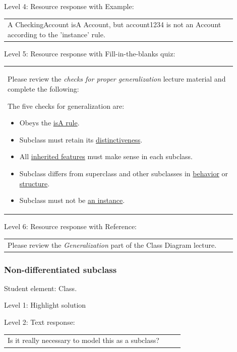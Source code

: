 \noindent Level 4: Resource response with Example: \medskip

\begin{tabular}{|p{0.9\linewidth}}
A CheckingAccount isA Account, but account1234 is not an Account according to the 'instance' rule.
\end{tabular} \medskip

\noindent Level 5: Resource response with Fill-in-the-blanks quiz: \medskip

\begin{tabular}{|p{0.9\linewidth}}

Please review the \textit{checks for proper generalization} lecture material
and complete the following:

The five checks for generalization are:

\begin{itemize}
    \item Obeys the \underline{isA rule}.
    \item Subclass must retain its \underline{distinctiveness}.
    \item All \underline{inherited features} must make sense in each subclass.
    \item Subclass differs from superclass and other subclasses in \underline{behavior} or \underline{structure}.
    \item Subclass must not be \underline{an instance}.
\end{itemize}

\end{tabular} \medskip

\noindent Level 6: Resource response with Reference: \medskip

\begin{tabular}{|p{0.9\linewidth}}
Please review the \textit{Generalization} part of the Class Diagram lecture.
\end{tabular} \medskip


\subsubsection{Non-differentiated subclass}

Student element: Class.  \medskip

\noindent Level 1: Highlight solution  \medskip

\noindent Level 2: Text response: \medskip

\begin{tabular}{|p{0.9\linewidth}}
Is it really necessary to model this as a subclass?
\end{tabular} \medskip


